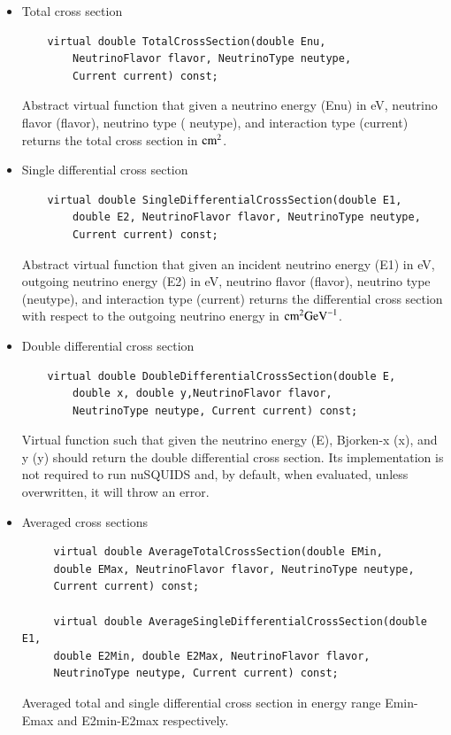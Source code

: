 \documentclass[3p,12pt]{elsarticle}
\newcommand{\ttf}{\ttfamily}
\begin{document}
\begin{itemize}
  \item Total cross section
  \begin{lstlisting}
    virtual double TotalCrossSection(double Enu,
    	NeutrinoFlavor flavor, NeutrinoType neutype,
    	Current current) const;
  \end{lstlisting}
  Abstract virtual function that given a neutrino energy ({\ttf Enu})
    in eV, neutrino flavor ({\ttf flavor}), neutrino type ({\ttf
    neutype}), and interaction type ({\ttf current}) returns the 
  total cross section in ${\rm cm}^2$.
  \item Single differential cross section
  \begin{lstlisting}
    virtual double SingleDifferentialCrossSection(double E1,
        double E2, NeutrinoFlavor flavor, NeutrinoType neutype,
    	Current current) const;
  \end{lstlisting}
  Abstract virtual function that given an incident neutrino energy
  ({\ttf E1}) in eV, outgoing neutrino energy ({\ttf E2}) in eV,
    neutrino flavor ({\ttf flavor}), neutrino type ({\ttf neutype}), and
  interaction type ({\ttf current}) returns the differential cross
  section with respect to the outgoing neutrino energy in ${\rm
    cm}^2{\rm GeV}^{-1}$.  
  \item Double differential cross section
  \begin{lstlisting}
    virtual double DoubleDifferentialCrossSection(double E, 
        double x, double y,NeutrinoFlavor flavor,
        NeutrinoType neutype, Current current) const;
  \end{lstlisting}
  Virtual function such that given the neutrino energy ({\ttf E}),
  Bjorken-x ({\ttf x}), and y ({\ttf y}) should return the double
   differential cross section. Its implementation is not required to
   run {\ttf nuSQUIDS} and, by default, when evaluated, unless
   overwritten, it will throw an error.
 \item Averaged cross sections
   \begin{lstlisting}
     virtual double AverageTotalCrossSection(double EMin,
     double EMax, NeutrinoFlavor flavor, NeutrinoType neutype,
     Current current) const;

     virtual double AverageSingleDifferentialCrossSection(double E1,
     double E2Min, double E2Max, NeutrinoFlavor flavor,
     NeutrinoType neutype, Current current) const;
   \end{lstlisting}
   Averaged total and single differential cross section in energy
   range {\ttf Emin}-{\ttf Emax} and {\ttf E2min}-{\ttf E2max} respectively. 
\end{itemize}
\end{document}
